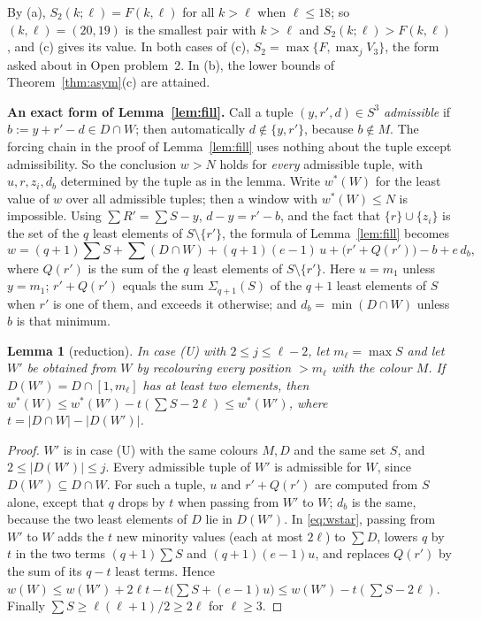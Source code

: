 \documentclass[11pt]{amsart}
\newtheorem{lemma}[theorem]{Lemma}
\theoremstyle{definition}
\newcommand{\F}{F}
\newcommand{\Stwo}{S_2}
\begin{document}
\noindent By (a), $\Stwo(k;\ell)=\F(k,\ell)$ for all $k>\ell$ when $\ell\le18$; so $(k,\ell)=(20,19)$ is the smallest pair with $k>\ell$ and $\Stwo(k;\ell)>\F(k,\ell)$, and (c) gives its value. In both cases of (c), $\Stwo=\max\{\F,\max_jV_3\}$, the form asked about in Open problem~2. In (b), the lower bounds of Theorem~\ref{thm:asym}(c) are attained.

\medskip\noindent\textbf{An exact form of Lemma~\ref{lem:fill}.} Call a tuple $(y,r',d)\in S^3$ \emph{admissible} if $b:=y+r'-d\in D\cap W$; then automatically $d\notin\{y,r'\}$, because $b\notin M$. The forcing chain in the proof of Lemma~\ref{lem:fill} uses nothing about the tuple except admissibility. So the conclusion $w>N$ holds for \emph{every} admissible tuple, with $u,r,z_i,d_b$ determined by the tuple as in the lemma. Write $w^*(W)$ for the least value of $w$ over all admissible tuples; then a window with $w^*(W)\le N$ is impossible. Using $\sum R'=\sum S-y$, $d-y=r'-b$, and the fact that $\{r\}\cup\{z_i\}$ is the set of the $q$ least elements of $S\setminus\{r'\}$, the formula of Lemma~\ref{lem:fill} becomes
\begin{equation}\label{eq:wstar}
w=(q+1)\textstyle\sum S+\sum(D\cap W)+(q+1)(e-1)\,u+\bigl(r'+Q(r')\bigr)-b+e\,d_b ,
\end{equation}
where $Q(r')$ is the sum of the $q$ least elements of $S\setminus\{r'\}$. Here $u=m_1$ unless $y=m_1$; $r'+Q(r')$ equals the sum $\Sigma_{q+1}(S)$ of the $q+1$ least elements of $S$ when $r'$ is one of them, and exceeds it otherwise; and $d_b=\min(D\cap W)$ unless $b$ is that minimum.

\begin{lemma}[reduction]\label{lem:reduce}
In case (U) with $2\le j\le\ell-2$, let $m_\ell=\max S$ and let $W'$ be obtained from $W$ by recolouring every position $>m_\ell$ with the colour $M$. If $D(W')=D\cap[1,m_\ell]$ has at least two elements, then $w^*(W)\le w^*(W')-t(\sum S-2\ell)\le w^*(W')$, where $t=|D\cap W|-|D(W')|$.
\end{lemma}

\begin{proof}
$W'$ is in case (U) with the same colours $M,D$ and the same set $S$, and $2\le|D(W')|\le j$. Every admissible tuple of $W'$ is admissible for $W$, since $D(W')\subseteq D\cap W$. For such a tuple, $u$ and $r'+Q(r')$ are computed from $S$ alone, except that $q$ drops by $t$ when passing from $W'$ to $W$; $d_b$ is the same, because the two least elements of $D$ lie in $D(W')$. In \eqref{eq:wstar}, passing from $W'$ to $W$ adds the $t$ new minority values (each at most $2\ell$) to $\sum D$, lowers $q$ by $t$ in the two terms $(q+1)\sum S$ and $(q+1)(e-1)u$, and replaces $Q(r')$ by the sum of its $q-t$ least terms. Hence $w(W)\le w(W')+2\ell t-t\bigl(\sum S+(e-1)u\bigr)\le w(W')-t(\sum S-2\ell)$. Finally $\sum S\ge\ell(\ell+1)/2\ge2\ell$ for $\ell\ge3$.
\end{proof}
\end{document}
